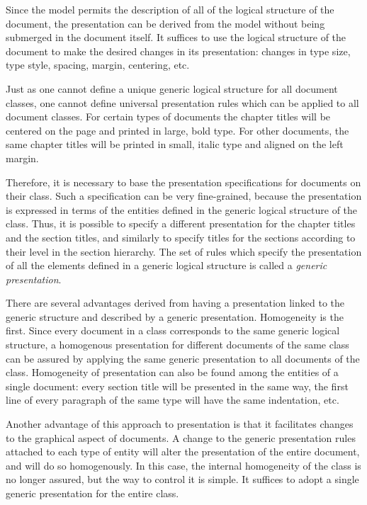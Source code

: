Since the model permits the description of all of the logical
structure of the document, the presentation can be derived from the
model without being submerged in the document itself.  It suffices to
use the logical structure of the document to make the desired changes
in its presentation: changes in type size, type style, spacing, margin,
centering, etc.

Just as one cannot define a unique generic logical structure for all
document classes, one cannot define universal presentation rules which
can be applied to all document classes.  For certain types of
documents the chapter titles will be centered on the page and printed
in large, bold type.  For other documents, the same chapter titles
will be printed in small, italic type and aligned on the left margin.

Therefore, it is necessary to base the presentation specifications for
documents on their class.  Such a specification can be very
fine-grained, because the presentation is expressed in terms of the
entities defined in the generic logical structure of the class.  Thus,
it is possible to specify a different presentation for the chapter
titles and the section titles, and similarly to specify titles for the
sections according to their level in the section hierarchy.  The set
of rules which specify the presentation of all the elements defined in
a generic logical structure is called a {\em generic presentation}.

There are several advantages derived from having a presentation linked
to the generic structure and described by a generic presentation.
Homogeneity is the first.  Since every document in a class corresponds
to the same generic logical structure, a homogenous presentation for
different documents of the same class can be assured by applying the
same generic presentation to all documents of the class.  Homogeneity
of presentation can also be found among the entities of a single
document: every section title will be presented  in the same way, the
first line of every paragraph of the same type will have the same
indentation, etc.

Another advantage of this approach to presentation is that it
facilitates changes to the graphical aspect of documents.  A change to
the generic presentation rules attached to each type of entity will
alter the presentation of the entire document, and will do so
homogenously.  In this case, the internal homogeneity of the class is
no longer assured, but the way to control it is simple.  It suffices
to adopt a single generic presentation for the entire class.

